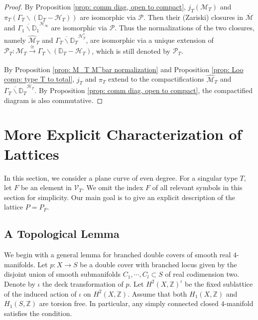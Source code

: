 \documentclass[
]{article}
\begin{document}
\emph{Proof.} By Proposition \ref{prop: comm diag, open to compact},
\(j_T(\mathcal{M}_T)\) and
\(\pi_T(\Gamma_T\backslash(\mathbb{D}_T-\mathcal{H}_T))\) are isomorphic
via \(\mathscr{P}\). Then their (Zariski) closures in
\(\overline{\mathcal{M}}\) and
\(\overline{\Gamma_1\backslash\mathbb{D}_1}^{\mathcal{H}_\infty}\) are
isomorphic via \(\mathscr{P}\). Thus the normalizations of the two
closures, namely \(\widehat{\mathcal{M}}_T\) and
\(\overline{\Gamma_T\backslash\mathbb{D}_T}^{\mathcal{H}_T^*}\), are
isomorphic via a unique extension of
\(\mathscr{P}_T\colon\mathcal{M}_T\xrightarrow[]{\cong}\Gamma_T\backslash(\mathbb{D}_T-\mathcal{H}_T)\),
which is still denoted by \(\mathscr{P}_T\).

By Proposition \ref{prop: M_T M^bar normalization} and Proposition
\ref{prop: Loo comp: type T to total}, \(j_T\) and \(\pi_T\) extend to
the compactifications \(\widehat{\mathcal{M}}_T\) and
\(\overline{\Gamma_T\backslash\mathbb{D}_T}^{\mathcal{H}_T}\). By
Proposition \ref{prop: comm diag, open to compact}, the compactified
diagram is also commutative.~◻

\section{More Explicit Characterization of
Lattices}\label{section:ux20explicitux20descriptionux20ofux20lattices}

In this section, we consider a plane curve of even degree. For a
singular type \(T\), let \(F\) be an element in \(\mathcal{V}_T\). We
omit the index \(F\) of all relevant symbols in this section for
simplicity. Our main goal is to give an explicit description of the
lattice \(P=P_F\).

\subsection{A Topological Lemma}\label{a-topological-lemma}

We begin with a general lemma for branched double covers of smooth real
\(4\)-manifolds. Let \(p\colon X\to S\) be a double cover with branched
locus given by the disjoint union of smooth submanifolds
\(C_1,\cdots,C_l \subset S\) of real codimension two. Denote by
\(\iota\) the deck transformation of \(p\). Let
\(H^2(X,\mathbb{Z})^\iota\) be the fixed sublattice of the induced
action of \(\iota\) on \(H^2(X,\mathbb{Z})\). Assume that both
\(H_1(X,\mathbb{Z})\) and \(H_1(S,\mathbb{Z})\) are torsion free. In
particular, any simply connected closed \(4\)-manifold satisfies the
condition.
\end{document}
